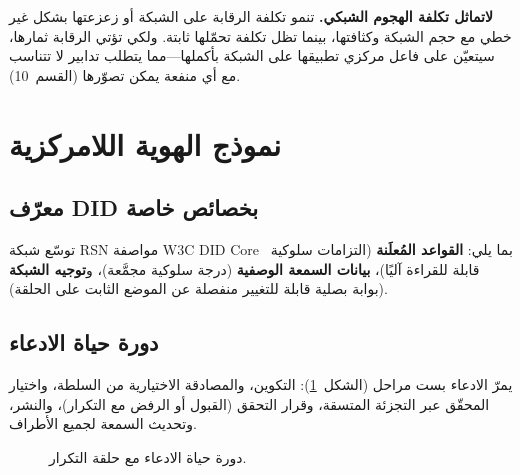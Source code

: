 \documentclass[11pt,a4paper,twocolumn]{article}
\begin{document}
\textbf{لاتماثل تكلفة الهجوم الشبكي.} تنمو تكلفة الرقابة على الشبكة أو زعزعتها بشكل غير خطي مع حجم الشبكة وكثافتها، بينما تظل تكلفة تحمّلها ثابتة. ولكي تؤتي الرقابة ثمارها، سيتعيّن على فاعل مركزي تطبيقها على الشبكة بأكملها---مما يتطلب تدابير لا تتناسب مع أي منفعة يمكن تصوّرها (القسم~10).

\section{نموذج الهوية اللامركزية}

\subsection{معرّف DID بخصائص خاصة}

توسّع شبكة RSN مواصفة W3C DID Core~\cite{did2022} بما يلي: \textbf{القواعد المُعلَنة} (التزامات سلوكية قابلة للقراءة آليًا)، \textbf{بيانات السمعة الوصفية} (درجة سلوكية مجمَّعة)، و\textbf{توجيه الشبكة} (بوابة بصلية قابلة للتغيير منفصلة عن الموضع الثابت على الحلقة).

\subsection{دورة حياة الادعاء}

يمرّ الادعاء بست مراحل (الشكل~\ref{fig:lifecycle}): التكوين، والمصادقة الاختيارية من السلطة، واختيار المحقّق عبر التجزئة المتسقة، وقرار التحقق (القبول أو الرفض مع التكرار)، والنشر، وتحديث السمعة لجميع الأطراف.

\begin{figure}[ht]
\centering
{}
\caption{دورة حياة الادعاء مع حلقة التكرار.}
\label{fig:lifecycle}
\end{figure}
\end{document}
